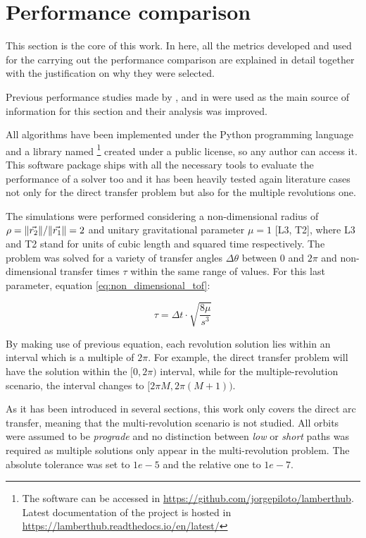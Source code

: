 \section{Performance comparison}
\label{sec:performance}

This section is the core of this work. In here, all the metrics developed and
used for the carrying out the performance comparison are explained in detail
together with the justification on why they were selected.

Previous performance studies made by \cite{klumpp1999}, \cite{torre2015} and in
\cite{martinez2021} were used as the main source of information for this section
and their analysis was improved.

All algorithms have been implemented under the Python programming language and a
library named \footnote{The software can be accessed in
\href{https://github.com/jorgepiloto/lamberthub}{https://github.com/jorgepiloto/lamberthub}.
Latest documentation of the project is hosted in
\href{https://lamberthub.readthedocs.io/en/latest/}{https://lamberthub.readthedocs.io/en/latest/}}
created under a public license, so any author can access it. This software
package ships with all the necessary tools to evaluate the performance of a
solver too and it has been heavily tested again literature cases not only for
the direct transfer problem but also for the multiple revolutions one.

The simulations were performed considering a non-dimensional radius of
$\rho=\lVert\vec{r_2}\rVert/\lVert\vec{r_1}\rVert=2$ and unitary gravitational parameter
$\mu=1$ [L3, T2], where L3 and T2 stand for units of cubic length and squared
time respectively. The problem was solved for a variety of transfer angles
$\Delta \theta$ between $0$ and $2\pi$ and non-dimensional transfer times $\tau$
within the same range of values. For this last parameter, equation
\ref{eq:non_dimensional_tof}:

\begin{equation}
  \tau =  \Delta t \cdot \sqrt{\frac{8\mu}{s^3}}
  \label{eq:non_dimensional_tof}
\end{equation}

By making use of previous equation, each revolution solution lies within an
interval which is a multiple of $2\pi$. For example, the direct transfer problem
will have the solution within the $[0, 2\pi)$ interval, while for the
multiple-revolution scenario, the interval changes to $[2\pi M, 2\pi(M+1))$.

As it has been introduced in several sections, this work only covers the direct
arc transfer, meaning that the multi-revolution scenario is not studied. All
orbits were assumed to be \textit{prograde} and no distinction between
\textit{low} or \textit{short} paths was required as multiple solutions only
appear in the multi-revolution problem. The absolute tolerance was set to $1e-5$
and the relative one to $1e-7$.

